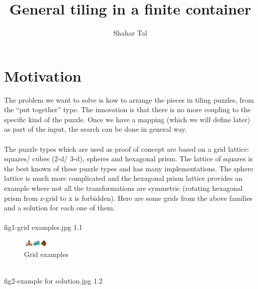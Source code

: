 \documentclass[a4paper,twoside,10pt]{report}
\begin{document}
\pagestyle{empty} %



\title{General tiling in a finite container}
\author{Shahar Tal}
\maketitle



\tableofcontents %
\cleardoublepage %

\pagestyle{plain} %







\chapter{Motivation}\label{Motivation}

The problem we want to solve is how to arrange the pieces in tiling puzzles, from the “put together” type. The innovation is that there is no more coupling to the specific kind of the puzzle. Once we have a mapping (which we will define later) as part of the input, the search can be done in general way.
\\
\\
The puzzle types which are used as proof of concept are based on a grid lattice: squares/ cubes (2-d/ 3-d), spheres and hexagonal prism. The lattice of squares is the best known of these puzzle types and has many implementations. The sphere lattice is much more complicated and the hexagonal prism lattice provides an example where not all the transformations are symmetric (rotating hexagonal prism from z-grid to x is forbidden). Here are some grids from the above families and a solution for each one of them.
\\
\\
fig1-grid examples.jpg 1.1
\\
\begin{figure}[p]
	\includegraphics[width=12mm]{fig1-grid_examples.jpg}
	\caption{Grid examples}
	\label{fig:Grid examples}
\end{figure}
\\
fig2-example for solution.jpg 1.2
\end{document}
